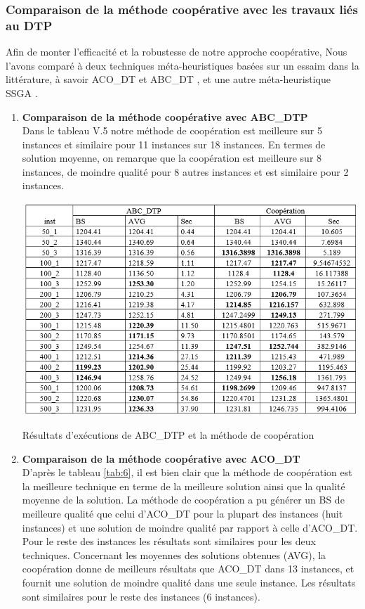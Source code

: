 \subsubsection{Comparaison de la méthode coopérative avec les travaux liés au DTP}
Afin de monter l’efficacité et la robustesse de notre approche coopérative, Nous l’avons comparé à deux techniques méta-heuristiques basées sur un essaim dans la littérature, à savoir ACO\_DT \cite{sundar2015ant} et ABC\_DT \cite{karaboga2008performance}, et une autre méta-heuristique SSGA \cite{sundar2014steady} .


\begin{enumerate}[label=\alph*)]
	\item \textbf{Comparaison de  la méthode coopérative avec ABC\_DTP}\\
	Dans le tableau V.5 notre méthode de coopération est meilleure sur 5 instances et similaire pour 11 instances sur 18 instances. En termes de solution moyenne, on remarque que la coopération est meilleure sur 8 instances, de moindre qualité pour 8 autres instances et est similaire pour 2 instances.
	
\begin{table}[H]
	\includegraphics[width=15cm,height=8cm]{Chap5/t5.png}
	\caption{Résultats d’exécutions de ABC\_DTP et la méthode de coopération}
	\label{tab:5}
\end{table}

	\item \textbf{Comparaison de  la méthode coopérative avec ACO\_DT}\\
	D’après le tableau \ref{tab:6}, il est bien clair que la méthode de coopération est la meilleure technique en terme de la meilleure solution ainsi que la qualité moyenne de la solution. La méthode de coopération a pu générer un BS de meilleure qualité que celui d’ACO\_DT pour la plupart des instances (huit instances) et une solution de moindre qualité par rapport à celle d’ACO\_DT. Pour le reste des instances les résultats sont similaires pour les deux techniques. Concernant les moyennes des solutions obtenues (AVG), la coopération donne de meilleurs résultats que ACO\_DT dans 13 instances, et fournit une solution de moindre qualité dans une seule instance. Les résultats sont similaires pour le reste des instances (6 instances).
	

\end{enumerate}

